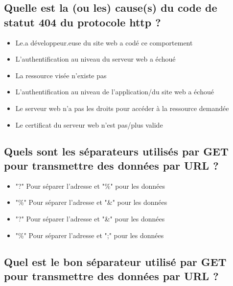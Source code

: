 \documentclass[11pt,a4paper]{article}
\begin{document}
\subsection{Quelle est la (ou les) cause(s) du code de statut 404 du protocole http ?}

\begin{itemize}
\item[\CaseCoche] Le.a développeur.euse du site web a codé ce comportement\\  %
\item[\CaseCoche] L'authentification au niveau du serveur web a échoué\\
\item[\CaseCoche] La ressource visée n'existe pas\\  %
\item[\CaseCoche] L'authentification au niveau de l'application/du site web a échoué\\
\item[\CaseCoche] Le serveur web n'a pas les droits pour accéder à la ressource demandée\\
\item[\CaseCoche] Le certificat du serveur web n'est pas/plus valide\\
\end{itemize}


\subsection{Quels sont les séparateurs utilisés par GET pour transmettre des données par URL ?}

\begin{itemize}
\item[\CaseCoche] "?" Pour séparer l'adresse et "\%" pour les données \\
\item[\CaseCoche] "\%" Pour séparer l'adresse et "\&" pour les données \\
\item[\CaseCoche] "?" Pour séparer l'adresse et "\&" pour les données \\  %
\item[\CaseCoche] "\%" Pour séparer l'adresse et ";" pour les données \\
\end{itemize}


\subsection{Quel est le bon séparateur utilisé par GET pour transmettre des données par URL ?}
\end{document}

